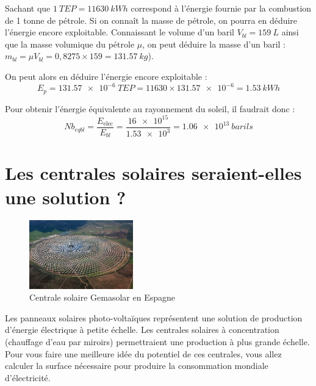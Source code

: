 \documentclass[10pt,fleqn]{article} %
\begin{document}
\begin{exercise}
\begin{solution}
    Sachant que $\SI{1}{TEP} = \SI{11630}{kWh}$ correspond à l'énergie fournie par la combustion de 1 tonne de pétrole. Si on connaît la masse de pétrole, on pourra en déduire l'énergie encore exploitable.
    Connaissant le volume d'un baril $V_{bl} = \SI{159}{L}$ ainsi que la masse volumique du pétrole $\mu$, on peut déduire la masse d'un baril : $m_{bl} = \mu V_{bl} = 0,8275 \times \num{159} =  \SI{131,57}{kg}$). 
    
    On peut alors en déduire l'énergie encore exploitable : 
    $$E_p = \SI{131,57e-6}{TEP} = 11630\times \num{131,57e-6} = \SI{1,53}{kWh}$$
    
    Pour obtenir l'énergie équivalente au rayonnement du soleil, il faudrait donc : 
    $$Nb_{eq bl} = \frac{E_{\text{elec}}}{E_{bl}} = \frac{\num{16e15}}{\num{1,53e3}} = \SI{1,06e13}{barils}$$
\end{solution}
\end{exercise}

\section{Les centrales solaires seraient-elles une solution ?}
\begin{figure}[ht]
    \centering
    \includegraphics[width=0.4\textwidth]{images/Gemasolar.jpg}
    \caption{Centrale solaire Gemasolar en Espagne}
    \label{fig:gemasolar}
\end{figure}
Les panneaux solaires photo-voltaïques représentent
une solution de production d’énergie électrique à petite
échelle. Les centrales solaires à concentration
(chauffage d’eau par miroirs) permettraient une
production à plus grande échelle.
Pour vous faire une meilleure idée du potentiel de ces
centrales, vous allez calculer la surface nécessaire pour
produire la consommation mondiale d'électricité.
\pagebreak
\end{document}
